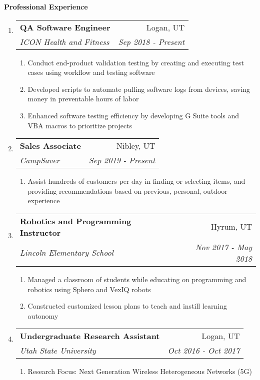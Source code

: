 \documentclass[letterpaper,10pt]{extarticle}
\makeatletter
\newcommand\tab[1][.25cm]{\hspace*{#1}} %
\newcommand{\resheading}[1]{{\large \colorbox{mygrey}{\begin{minipage}{\textwidth}{\textbf{#1 \vphantom{p\^{E}}}}\end{minipage}}}}
\newcommand{\ressubheading}[4]{
\begin{tabular*}{7.5in}{l@{\extracolsep{\fill}}r}
		\tab\textbf{#1} & #2 \\
		\tab\textit{#3} & \textit{#4} \\
\end{tabular*}\vspace{-6pt}}
\newcommand{\resitem}[1]{\item #1 \vspace{-2pt}}
\makeatother
\begin{document}
\resheading{Professional Experience}
\vspace{-.4cm}
\begin{enumerate}
\setlength\itemsep{-.5em}

\item[]
	\ressubheading{QA Software Engineer}{Logan, UT}{ICON Health and Fitness}{Sep 2018 - Present}
	\begin{enumerate}
		\setlength\itemsep{-.25em}
		\resitem[--]{Conduct end-product validation testing by creating and executing test cases using workflow and testing software}
		\resitem[--]{Developed scripts to automate pulling software logs from devices, saving money in preventable hours of labor}
		\resitem[--]{Enhanced software testing efficiency by developing G Suite tools and VBA macros to prioritize projects}
	\end{enumerate}
\item[]
	\ressubheading{Sales Associate}{Nibley, UT}{CampSaver}{Sep 2019 - Present}
	\begin{enumerate}
		\setlength\itemsep{-.25em}
		\resitem[--]{Assist hundreds of customers per day in finding or selecting items, and providing recommendations based on previous, personal, outdoor experience}
	\end{enumerate}
\begin{comment}
\item[]
	\ressubheading{Youth Dorm Counselor}{Logan, UT}{Logan River Academy}{Jun 2018 - Sep 2018}
	\begin{enumerate}
		\setlength\itemsep{-.25em}
		\resitem[--]{Manage, counsel, and mentor a dorm of up to 12 teenagers with behavioral disorders, often leading outdoor activities}
	\end{enumerate}
\end{comment} 

\item[]
	\ressubheading{Robotics and Programming Instructor}{Hyrum, UT}{Lincoln Elementary School}{Nov 2017 - May 2018}
	\begin{enumerate}
		\setlength\itemsep{-.25em}
		\resitem[--]{Managed a classroom of students while educating on programming and robotics using Sphero and VexIQ robots}
		\resitem[--]{Constructed customized lesson plans to teach and instill learning autonomy}
	\end{enumerate}
	
\item[]
	\ressubheading{Undergraduate Research Assistant}{Logan, UT}{Utah State University}{Oct 2016 - Oct 2017}
	\begin{enumerate}
		\resitem[--]{Research Focus: Next Generation Wireless Heterogeneous Networks (5G)}
	\end{enumerate}
	

\end{enumerate}
\end{document}
